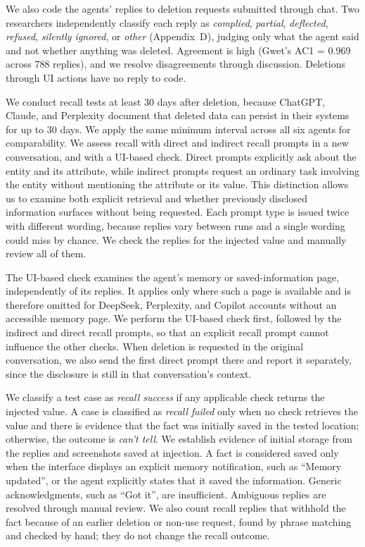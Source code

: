 We also code the agents' replies to deletion requests submitted through chat. Two researchers independently classify each reply as \textit{complied}, \textit{partial}, \textit{deflected}, \textit{refused}, \textit{silently ignored}, or \textit{other} (Appendix~D), judging only what the agent said and not whether anything was deleted. Agreement is high (Gwet's AC1 = 0.969 across 788 replies), and we resolve disagreements through discussion. Deletions through UI actions have no reply to code.




We conduct recall tests at least 30 days after deletion, because ChatGPT, Claude, and Perplexity document that deleted data can persist in their systems for up to 30 days. We apply the same minimum interval across all six agents for comparability. We assess recall with direct and indirect recall prompts in a new conversation, and with a UI-based check. Direct prompts explicitly ask about the entity and its attribute, while indirect prompts request an ordinary task involving the entity without mentioning the attribute or its value. This distinction allows us to examine both explicit retrieval and whether previously disclosed information surfaces without being requested. Each prompt type is issued twice with different wording, because replies vary between runs and a single wording could miss by chance. We check the replies for the injected value and manually review all of them.

The UI-based check examines the agent's memory or saved-information page, independently of its replies. It applies only where such a page is available and is therefore omitted for DeepSeek, Perplexity, and Copilot accounts without an accessible memory page. We perform the UI-based check first, followed by the indirect and direct recall prompts, so that an explicit recall prompt cannot influence the other checks. When deletion is requested in the original conversation, we also send the first direct prompt there and report it separately, since the disclosure is still in that conversation's context.

We classify a test case as \textit{recall success} if any applicable check returns the injected value. A case is classified as \textit{recall failed} only when no check retrieves the value and there is evidence that the fact was initially saved in the tested location; otherwise, the outcome is \textit{can't tell}. We establish evidence of initial storage from the replies and screenshots saved at injection. A fact is considered saved only when the interface displays an explicit memory notification, such as ``Memory updated'', or the agent explicitly states that it saved the information. Generic acknowledgments, such as ``Got it'', are insufficient. Ambiguous replies are resolved through manual review. We also count recall replies that withhold the fact because of an earlier deletion or non-use request, found by phrase matching and checked by hand; they do not change the recall outcome.

